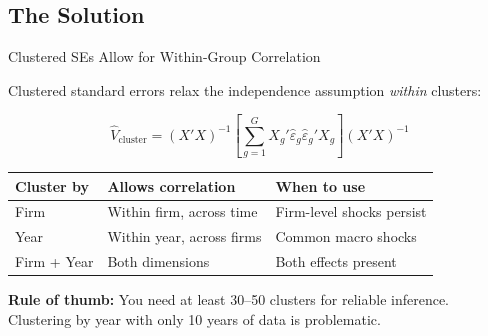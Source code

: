 \documentclass[9pt,aspectratio=169]{beamer}
\begin{document}
\subsection{The Solution}
\begin{frame}{Clustered SEs Allow for Within-Group Correlation}

\alert{Clustered standard errors} relax the independence assumption \textit{within} clusters:

$$\hat{V}_{\text{cluster}} = (X'X)^{-1} \left[\sum_{g=1}^{G} X_g' \hat{\varepsilon}_g \hat{\varepsilon}_g' X_g \right] (X'X)^{-1}$$

\medskip

\begin{tabular}{@{}llp{5cm}@{}}
\toprule
\textbf{Cluster by} & \textbf{Allows correlation} & \textbf{When to use} \\
\midrule
Firm & Within firm, across time & Firm-level shocks persist \\[0.4em]
Year & Within year, across firms & Common macro shocks \\[0.4em]
Firm + Year & Both dimensions & Both effects present \\
\bottomrule
\end{tabular}

\bigskip

\begin{highlightbox}
\centering
\textbf{Rule of thumb:} You need at least 30--50 clusters for reliable inference. Clustering by year with only 10 years of data is problematic.
\end{highlightbox}

\end{frame}
\end{document}
